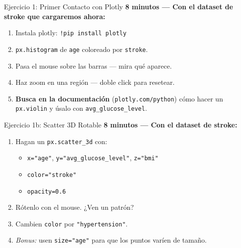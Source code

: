 \documentclass[aspectratio=169, 11pt]{beamer}
\begin{document}
\begin{frame}[shrink=5]{Ejercicio 1: Primer Contacto con Plotly}
  \vspace{-4pt}
  {\footnotesize\color{arcaDark}\bfseries
    \faClock\hspace{4pt} 8 minutos --- Con el dataset de stroke que
    cargaremos ahora:}

  \vspace{6pt}
  {\footnotesize
  \begin{enumerate}\setlength{\itemsep}{4pt}
    \item Instala plotly: \texttt{!pip install plotly}
    \item \texttt{px.histogram} de \texttt{age} coloreado por \texttt{stroke}.
    \item Pasa el mouse sobre las barras --- mira qué aparece.
    \item Haz zoom en una región --- doble click para resetear.
    \item \textbf{Busca en la documentación}
      (\texttt{plotly.com/python}) cómo hacer un \texttt{px.violin}
      y úsalo con \texttt{avg\_glucose\_level}.
  \end{enumerate}
  }
\end{frame}

\begin{frame}[shrink=5]{Ejercicio 1b: Scatter 3D Rotable}
  \vspace{-4pt}
  {\footnotesize\color{arcaDark}\bfseries
    \faClock\hspace{4pt} 8 minutos --- Con el dataset de stroke:}

  \vspace{6pt}
  {\footnotesize
  \begin{enumerate}\setlength{\itemsep}{4pt}
    \item Hagan un \texttt{px.scatter\_3d} con:
      \begin{itemize}
        \item \texttt{x="age"}, \texttt{y="avg\_glucose\_level"}, \texttt{z="bmi"}
        \item \texttt{color="stroke"}
        \item \texttt{opacity=0.6}
      \end{itemize}
    \item Rótenlo con el mouse. ¿Ven un patrón?
    \item Cambien \texttt{color} por \texttt{"hypertension"}.
    \item \textit{Bonus:} usen \texttt{size="age"} para que los puntos
      varíen de tamaño.
  \end{enumerate}
  }
\end{frame}
\end{document}
